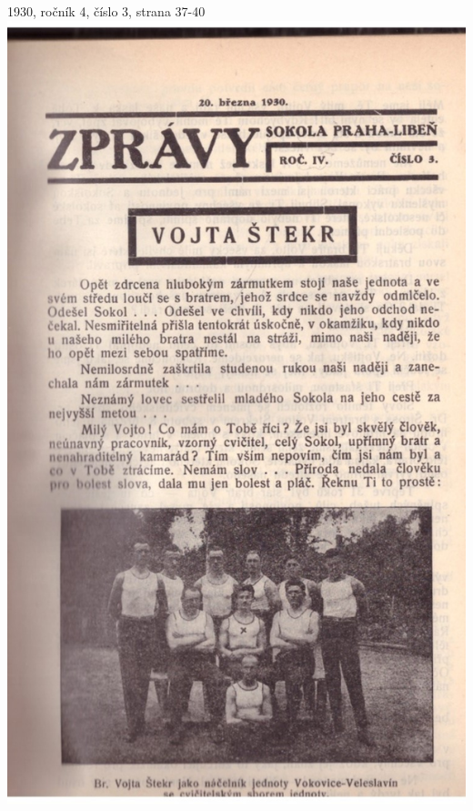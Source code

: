 \documentclass[11pt]{article}
\begin{document}
1930, ročník 4, číslo 3, strana 37-40 \\
\includegraphics[width=\imagewidth]{original/1930/Skener_20250316 (7).jpg}
\end{document}
